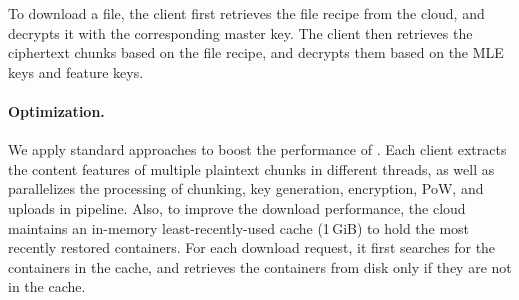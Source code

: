 To download a file, the client first retrieves the file recipe from the cloud, and decrypts it with the corresponding master key. The client then retrieves the ciphertext chunks based on the file recipe, and decrypts them based on the MLE keys and feature keys.

\paragraph{Optimization.}
We apply standard approaches to boost the performance of \prototype. Each client  extracts the content features of multiple plaintext chunks in different threads, as well as parallelizes the processing of chunking, key generation, encryption, PoW, and uploads in pipeline. Also,
to improve the download performance, the cloud maintains an in-memory least-recently-used cache (1\,GiB) to hold the most recently restored containers. For each download request, it first searches for the containers in the cache, and retrieves the
containers from disk only if they are not in the cache.














